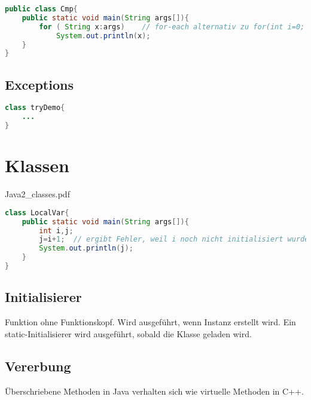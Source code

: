 \begin{lstlisting}[language=Java]
public class Cmp{
	public static void main(String args[]){		
		for ( String x:args) 	// for-each alternativ zu for(int i=0; i<args.length; i++) {x=args[i]; System.out.println(x);}
			System.out.println(x);
	}
}
\end{lstlisting}

\subsection{Exceptions}
\begin{lstlisting}[language=Java]
class tryDemo{
	...
}
\end{lstlisting}

\section{Klassen}
Java2\_classes.pdf

\begin{lstlisting}[language=Java]
class LocalVar{
	public static void main(String args[]){
		int i,j;
		j=i+1;	// ergibt Fehler, weil i noch nicht initialisiert wurde.
		System.out.println(j);
	}
}
\end{lstlisting}

\subsection{Initialisierer}
Funktion ohne Funktionskopf. Wird ausgeführt, wenn Instanz erstellt wird. Ein static-Initialisierer wird ausgeführt, sobald die Klasse geladen wird.
\subsection{Vererbung}
Überschriebene Methoden in Java verhalten sich wie virtuelle Methoden in C++.

